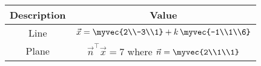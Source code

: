 \begin{tabular}{|c|c|}
\hline
\textbf{Description} & \textbf{Value} \\
\hline
Line & $\vec{x} = \myvec{2\\-3\\1} + k\,\myvec{-1\\1\\6}$ \\ \hline
Plane & $\vec{n}^{\top}\vec{x} = 7$ \quad where \quad $\vec{n} = \myvec{2\\1\\1}$ \\ \hline
\end{tabular}
